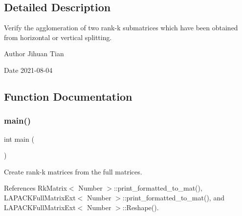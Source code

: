 \subsection{Detailed Description}
Verify the agglomeration of two rank-\/k submatrices which have been obtained from horizontal or vertical splitting. 

\begin{DoxyAuthor}{Author}
Jihuan Tian 
\end{DoxyAuthor}
\begin{DoxyDate}{Date}
2021-\/08-\/04 
\end{DoxyDate}


\subsection{Function Documentation}
\mbox{\label{rkmatrix-agglomeration-of-two-submatrices_8cc_ae66f6b31b5ad750f1fe042a706a4e3d4}} 
\subsubsection{\texorpdfstring{main()}{main()}}
{\footnotesize\ttfamily int main (\begin{DoxyParamCaption}{ }\end{DoxyParamCaption})}

Create rank-\/k matrices from the full matrices.

References Rk\+Matrix$<$ Number $>$\+::print\+\_\+formatted\+\_\+to\+\_\+mat(), L\+A\+P\+A\+C\+K\+Full\+Matrix\+Ext$<$ Number $>$\+::print\+\_\+formatted\+\_\+to\+\_\+mat(), and L\+A\+P\+A\+C\+K\+Full\+Matrix\+Ext$<$ Number $>$\+::\+Reshape().

